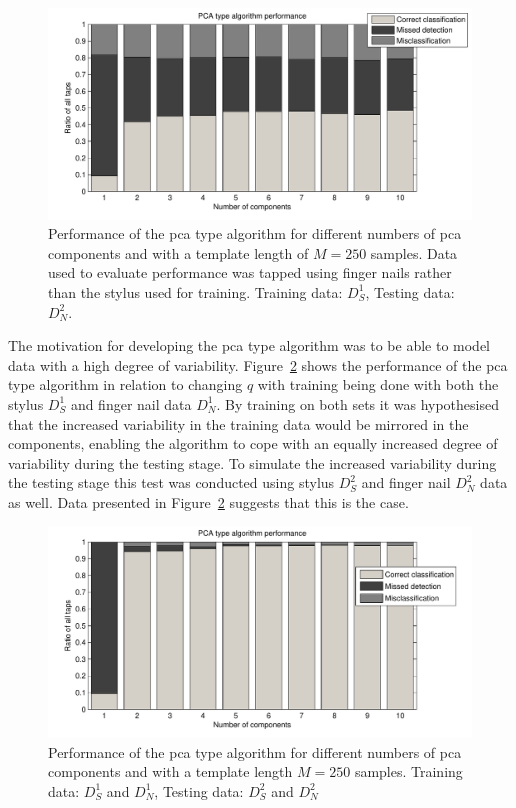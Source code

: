 \begin{figure}[!] %
\centering
\includegraphics[width=150mm]{PCAperformNail.pdf}
\caption{Performance of the \gls{pca} type algorithm for different numbers of \gls{pca} components and with a template length of $M=250$ samples. Data used to evaluate performance was tapped using finger nails rather than the stylus used for training. Training data: $D^1_S$, Testing data: $D^2_N$.}\label{fig:PCAperformNail}
\end{figure}

The motivation for developing the \gls{pca} type algorithm was to be able to model data with a high degree of variability. Figure~\ref{fig:PCAperform_SN-SN} shows the performance of the \gls{pca} type algorithm in relation to changing $q$ with training being done with both the stylus $D^1_S$ and finger nail data $D^1_N$. By training on both sets it was hypothesised that the increased variability in the training data would be mirrored in the components, enabling the algorithm to cope with an equally increased degree of variability during the testing stage. To simulate the increased variability during the testing stage this test was conducted using stylus $D^2_S$ and finger nail $D^2_N$ data as well. Data presented in Figure~\ref{fig:PCAperform_SN-SN} suggests that this is the case.

\begin{figure}[!] %
\centering
\includegraphics[width=150mm]{PCAperform_SN-SN.pdf}
\caption{Performance of the \gls{pca} type algorithm for different numbers of \gls{pca} components and with a template length $M=250$ samples. Training data: $D^1_S$ and $D^1_N$, Testing data: $D^2_S$ and $D^2_N$}\label{fig:PCAperform_SN-SN}
\end{figure}

